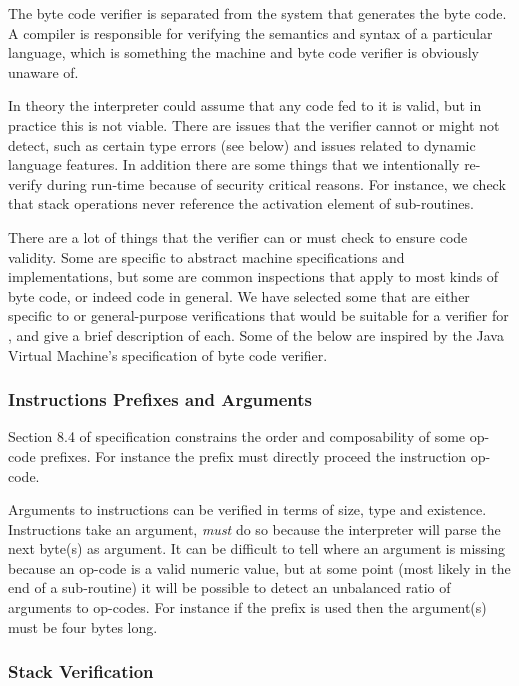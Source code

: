 The byte code verifier is separated from the system that generates the byte
code. A compiler is responsible for verifying the semantics and syntax of a
particular language, which is something the machine and byte code verifier is
obviously unaware of.

In theory the interpreter could assume that any code fed to it is valid, but in
practice this is not viable. There are issues that the verifier cannot or might
not detect, such as certain type errors (see below) and issues related to
dynamic language features. In addition there are some things that we
intentionally re-verify during run-time because of security critical
reasons. For instance, we check that stack operations never reference the
activation element of sub-routines.

There are a lot of things that the verifier can or must check to ensure code
validity. Some are specific to abstract machine specifications and
implementations, but some are common inspections that apply to most kinds of
byte code, or indeed code in general. We have selected some that are either
specific to \thename{} or general-purpose verifications that would be suitable
for a verifier for \thename{}, and give a brief description of each. Some of the
below are inspired by the Java Virtual Machine's specification of byte code
verifier\cite{jvm-spec}.

\subsubsection{Instructions Prefixes and Arguments}

Section 8.4 of \thename{} specification constrains the order and composability
of some op-code prefixes. For instance the  prefix must directly
proceed the instruction op-code.

Arguments to instructions can be verified in terms of size, type and
existence. Instructions take an argument, \emph{must} do so because the
interpreter will parse the next byte(s) as argument. It can be difficult to tell
where an argument is missing because an op-code is a valid numeric value, but at
some point (most likely in the end of a sub-routine) it will be possible to
detect an unbalanced ratio of arguments to op-codes. For instance if the
 prefix is used then the argument(s) must be four bytes long.

\subsubsection{Stack Verification}

